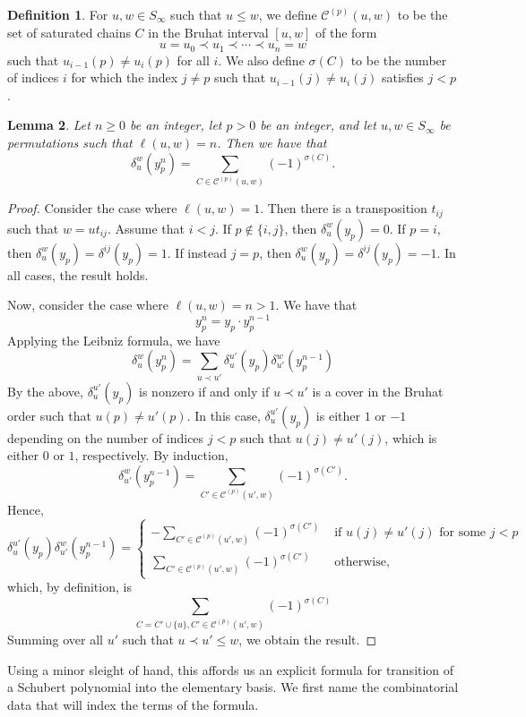 \documentclass{amsart}
\newtheorem{lemma}{Lemma}[subsection]
\theoremstyle{definition}
\newtheorem{definition}[lemma]{Definition}
\theoremstyle{remark}
\numberwithin{equation}{subsection}
\begin{document}
\newcommand{\achain}[1]{\mathcal{C}^{(#1)}}
\begin{definition}
For $u,w\in S_\infty$ such that $u\leq w$, we define $\achain{p}(u,w)$ to be the set of saturated chains $C$ in the Bruhat interval $[u,w]$ of the form
$$u=u_0\prec u_1\prec \cdots \prec u_n=w$$  
such that $u_{i-1}(p)\neq u_i(p)$ for all $i$. We also define $\sigma(C)$ to be the number of indices $i$ for which the index $j\neq p$ such that $u_{i-1}(j)\neq u_i(j)$ satisfies $j<p$.
\end{definition}

\begin{lemma} \label{lemma:powerdiff}
Let $n\geq 0$ be an integer, let $p>0$ be an integer, and let $u, w\in S_\infty$ be permutations such that $\ell(u,w)=n$. Then we have that 
$$\delta_u^w(y_p^n) = \sum_{C\in \achain{p}(u,w)} (-1)^{\sigma(C)}.$$
\end{lemma}
\begin{proof}

  

Consider the case where $\ell(u,w)=1$. Then there is a transposition $t_{ij}$ such that $w = ut_{ij}$. Assume that $i<j$. If $p\notin\{i,j\}$, then $\delta_u^w(y_p)=0$. If $p=i$, then $\delta_u^w(y_p) = \delta^{ij}(y_p) = 1$. If instead $j=p$, then $\delta_u^w(y_p) = \delta^{ij}(y_p) = -1$. In all cases, the result holds.

Now, consider the case where $\ell(u,w)=n>1$. We have that
$$y_p^n = y_p\cdot y_p^{n-1}$$
Applying the Leibniz formula, we have
$$\delta_u^w(y_p^n) = \sum_{u\prec u'}\delta_u^{u'}(y_p)\delta_{u'}^w(y_p^{n-1})$$
By the above, $\delta_u^{u'}(y_p)$ is nonzero if and only if $u\prec u'$ is a cover in the Bruhat order such that $u(p)\neq u'(p)$. In this case, $\delta_u^{u'}(y_p)$ is either $1$ or $-1$ depending on the number of indices $j<p$ such that $u(j)\neq u'(j)$, which is either $0$ or $1$, respectively. By induction, 
$$\delta_{u'}^w(y_p^{n-1}) = \sum_{C'\in \achain{p}(u',w)} (-1)^{\sigma(C')}.$$
Hence, 
$$\delta_u^{u'}(y_p)\delta_{u'}^w(y_p^{n-1})=\begin{cases}
-\displaystyle\sum_{C'\in \achain{p}(u',w)} (-1)^{\sigma(C')}&\mbox{ if }u(j)\neq u'(j)\mbox{ for some }j<p\\
\displaystyle\sum_{C'\in \achain{p}(u',w)} (-1)^{\sigma(C')}&\mbox{ otherwise,}
\end{cases}$$
which, by definition, is
$$\sum_{C=C'\cup\{u\}, C'\in \achain{p}(u',w)} (-1)^{\sigma(C)}$$
Summing over all $u'$ such that $u\prec u'\leq w$, we obtain the result.
\end{proof}
Using a minor sleight of hand, this affords us an explicit formula for transition of a Schubert polynomial into the elementary basis. We first name the combinatorial data that will index the terms of the formula.
\end{document}
